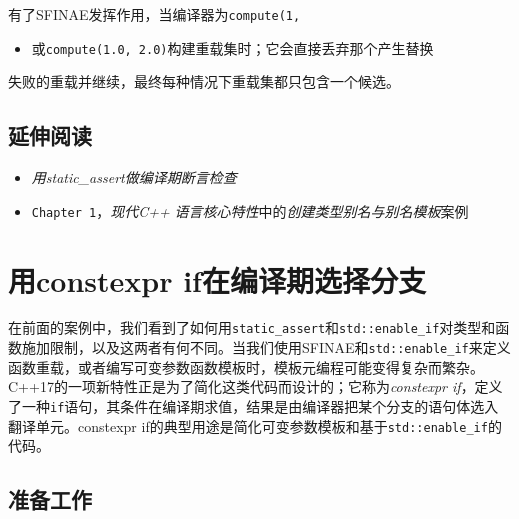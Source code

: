 
有了SFINAE发挥作用，当编译器为\texttt{compute(\allowbreak{}1,}



\begin{itemize}
\item 或\texttt{compute(\allowbreak{}1.\allowbreak{}0, 2.\allowbreak{}0)}构建重载集时；它会直接丢弃那个产生替换

\end{itemize}



失败的重载并继续，最终每种情况下重载集都只包含一个候选。



\subsection{延伸阅读}



\begin{itemize}
\item \textit{用static\_assert做编译期断言检查}



\item \texttt{Chapter 1}，\textit{现代C++} \textit{语言核心特性}中的\textit{创建类型别名与别名模板}案例

\end{itemize}



\section{用constexpr if在编译期选择分支}



在前面的案例中，我们看到了如何用\texttt{static\_\allowbreak{}assert}和\texttt{std::\allowbreak{}enable\_\allowbreak{}if}对类型和函数施加限制，以及这两者有何不同。当我们使用SFINAE和\texttt{std::\allowbreak{}enable\_\allowbreak{}if}来定义函数重载，或者编写可变参数函数模板时，模板元编程可能变得复杂而繁杂。C++17的一项新特性正是为了简化这类代码而设计的；它称为\textit{constexpr if}，定义了一种\texttt{if}语句，其条件在编译期求值，结果是由编译器把某个分支的语句体选入翻译单元。constexpr if的典型用途是简化可变参数模板和基于\texttt{std::\allowbreak{}enable\_\allowbreak{}if}的代码。



\subsection{准备工作}


